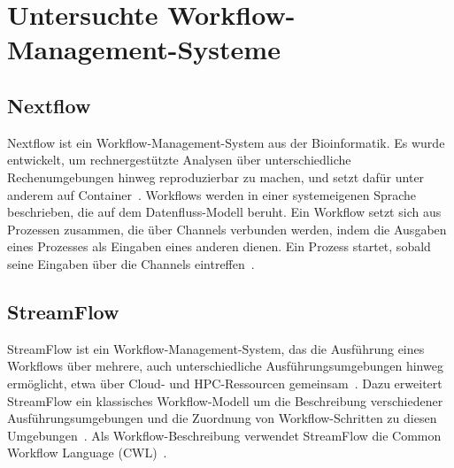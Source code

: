 \section{Untersuchte Workflow-Management-Systeme}
\label{sec:basics:systeme}


\subsection{Nextflow}
\label{sec:basics:nextflow}
Nextflow ist ein Workflow-Management-System aus der Bioinformatik.
Es wurde entwickelt, um rechnergestützte Analysen über
unterschiedliche Rechenumgebungen hinweg reproduzierbar zu machen,
und setzt dafür unter anderem auf
Container~\cite[S.~316]{ditommaso2017nextflow}. Workflows werden in
einer systemeigenen Sprache beschrieben, die auf dem
Datenfluss-Modell beruht. Ein Workflow setzt sich aus Prozessen
zusammen, die über Channels verbunden werden, indem die Ausgaben
eines Prozesses als Eingaben eines anderen dienen. Ein Prozess
startet, sobald seine Eingaben über die Channels
eintreffen~\cite[S.~316\,f.]{ditommaso2017nextflow}.


\subsection{StreamFlow}
\label{sec:basics:streamflow}
\begin{sloppypar}
StreamFlow ist ein Workflow-Management-System, das die Ausführung
eines Workflows über mehrere, auch unterschiedliche Ausführungsumgebungen hinweg ermöglicht, etwa über Cloud- und HPC-Ressourcen gemeinsam~\cite[S.~1723]{colonnelli2021streamflow}. Dazu erweitert StreamFlow ein klassisches Workflow-Modell um die Beschreibung verschiedener Ausführungsumgebungen und die Zuordnung von Workflow-Schritten zu diesen Umgebungen~\cite[S.~1723]{colonnelli2021streamflow}. Als Workflow-Beschreibung verwendet StreamFlow die Common Workflow Language (CWL)~\cite[S.~1723]{colonnelli2021streamflow}.
\end{sloppypar}

